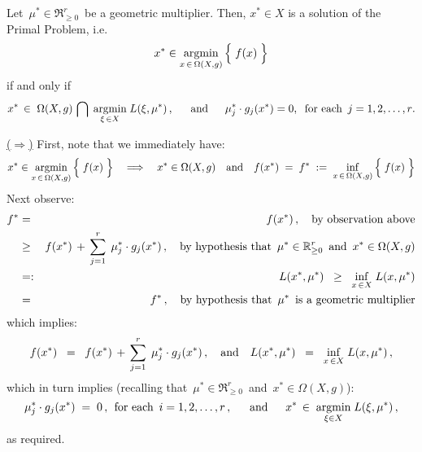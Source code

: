 \vskip 0.5cm
\begin{theorem}
\mbox{}
\vskip 0.1cm
\noindent
Let \,$\mu^{*} \in \Re^{r}_{\geq 0}$\, be a geometric multiplier.
Then, $x^{*} \in X$ is a solution of the Primal Problem, i.e.
\begin{equation*}
x^{*} \in \underset{x\,\in\,\Omega(X,g)}{\argmin}\left\{\;\overset{{\color{white}.}}{f(x)}\;\right\}
\end{equation*}
if and only if
\begin{equation*}
x^{*} \,\in\; \Omega(X,g) \,\bigcap\; \underset{\xi\,\in X}{\argmin}\;L(\xi,\mu^{*})\,,\;\;
\quad\textnormal{and}\quad\;\;
\mu_{j}^{*} \cdot g_{j}(x^{*}) = 0, \;\;\textnormal{for each \,$j = 1,2,\ldots,r$}.
\end{equation*}
\end{theorem}
\proof
\mbox{}
\vskip 0.1cm
\noindent
\underline{($\Longrightarrow$)}
\quad
First, note that we immediately have:
\begin{equation*}
x^{*} \in \underset{x\,\in\,\Omega(X,g)}{\argmin}\left\{\;\overset{{\color{white}.}}{f(x)}\;\right\}
\quad\Longrightarrow\quad
x^{*} \in \Omega(X,g)
\quad\textnormal{and}\quad
f(x^{*})
\; = \;
	f^{*}
\; := \;
	\underset{x\,\in\,\Omega(X,g)}{\inf}\left\{\;
		\overset{{\color{white}.}}{f(x)}
		\;\right\}
\end{equation*}
Next observe:
\begin{eqnarray*}
f^{*}
& = &
	f(x^{*})\,,
	\quad\textnormal{by observation above}
\\
& \geq &
	f(x^{*}) \,+\, \overset{r}{\underset{j=1}{\sum}}\;\,\mu_{j}^{*} \cdot g_{j}(x^{*})\,,
	\quad\textnormal{by hypothesis that \,$\mu^{*} \in \Re^{r}_{\geq 0}$\, and \,$x^{*} \in \Omega(X,g)$}
\\
& =: &
	L(x^{*},\mu^{*})
\;\; \geq \;\;
	\underset{x\,\in X}{\inf}\;L(x,\mu^{*})
\\
& = &
	f^{*}\,,
	\quad\textnormal{by hypothesis that \,$\mu^{*}$\, is a geometric multiplier}
\end{eqnarray*}
which implies:
\begin{equation*}
f(x^{*})
\;\; = \;\;
	f(x^{*}) \,+\, \overset{r}{\underset{j=1}{\sum}}\;\,\mu_{j}^{*} \cdot g_{j}(x^{*})\,,
\quad\textnormal{and}\quad
L(x^{*},\mu^{*})
\;\; = \;\;
	\underset{x\,\in X}{\inf}\;L(x,\mu^{*})\,,
\end{equation*}
which in turn implies (recalling that \,$\mu^{*} \in \Re^{r}_{\geq 0}$\, and \,$x^{*} \in \Omega(X,g)$):
\begin{equation*}
\mu_{j}^{*} \cdot g_{j}(x^{*}) \; = \; 0\,,\;\,\textnormal{for each \,$i = 1,2,\ldots, r$}\,,
\;\;\quad\textnormal{and}\quad\;\;
x^{*} \,\in\; \underset{\xi\in X}{\argmin}\;L(\xi,\mu^{*})\,,
\end{equation*}
as required.

